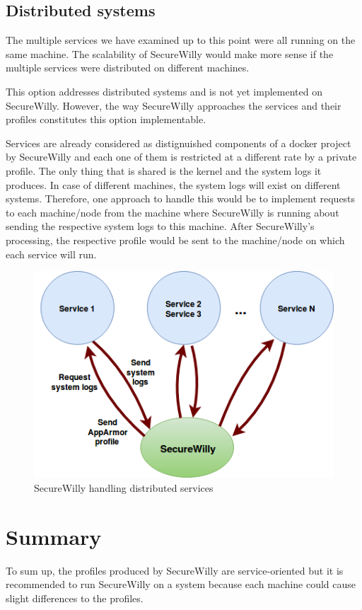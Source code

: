 \subsection{Distributed systems}
The multiple services we have examined up to this point were all running on the same machine. The scalability of SecureWilly would make more sense if the multiple services were distributed on different machines.

This option addresses distributed systems and is not yet implemented on SecureWilly. However, the way SecureWilly approaches the services and their profiles constitutes this option implementable.

Services are already considered as distignuished components of a docker project by SecureWilly and each one of them is restricted at a different rate by a private profile. The only thing that is shared is the kernel and the system logs it produces. In case of different machines, the system logs will exist on different systems. Therefore, one approach to handle this would be to implement requests to each machine/node from the machine where SecureWilly is running about sending the respective system logs to this machine. After SecureWilly's processing, the respective profile would be sent to the machine/node on which each service will run.

\begin{figure}[h!]
  \centering
   \includegraphics[width=0.68\linewidth]{../figures/DistributedSystems.png}
   \caption{SecureWilly handling distributed services}
\end{figure}

\section{Summary}
To sum up, the profiles produced by SecureWilly are service-oriented but it is recommended to run SecureWilly on a system because each machine could cause slight differences to the profiles.

